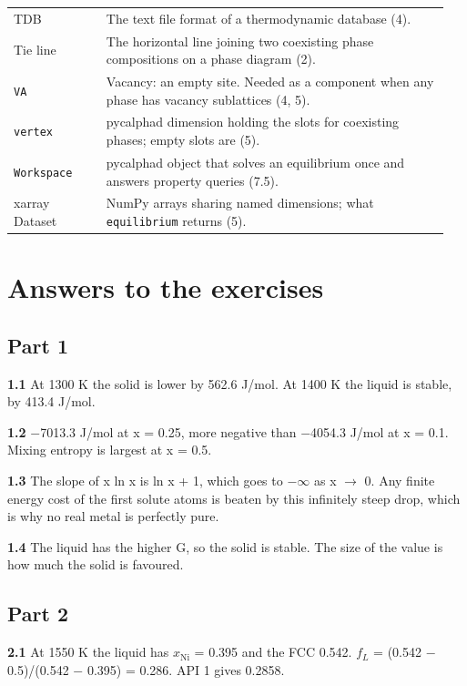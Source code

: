 \documentclass[12pt,a4paper]{article}
\begin{document}
\begin{longtable}{>{\raggedright\arraybackslash}p{0.202\linewidth}>{\raggedright\arraybackslash}p{0.745\linewidth}}
TDB & The text file format of a thermodynamic database (4). \\
Tie line & The horizontal line joining two coexisting phase compositions on a phase diagram (2). \\
\texttt{VA} & Vacancy: an empty site. Needed as a component when any phase has vacancy sublattices (4, 5). \\
\texttt{vertex} & pycalphad dimension holding the slots for coexisting phases; empty slots are \texttt{\textquotesingle{}\textquotesingle{}} (5). \\
\texttt{Workspace} & pycalphad object that solves an equilibrium once and answers property queries (7.5). \\
xarray Dataset & NumPy arrays sharing named dimensions; what \texttt{equilibrium} returns (5). \\
\bottomrule
\end{longtable}
\endgroup

\section*{Answers to the exercises}

\subsection*{Part 1}
\textbf{1.1} At 1300 K the solid is lower by 562.6 J/mol. At 1400 K the liquid is stable, by 413.4 J/mol.

\textbf{1.2} \(-\)7013.3 J/mol at x = 0.25, more negative than \(-\)4054.3 J/mol at x = 0.1. Mixing entropy is largest at x = 0.5.

\textbf{1.3} The slope of x ln x is ln x + 1, which goes to \(- \infty\) as x \(\rightarrow\) 0. Any finite energy cost of the first solute atoms is beaten by this infinitely steep drop, which is why no real metal is perfectly pure.

\textbf{1.4} The liquid has the higher G, so the solid is stable. The size of the value is how much the solid is favoured.


\subsection*{Part 2}
\textbf{2.1} At 1550 K the liquid has \(x_{\mathrm{Ni}}\) = 0.395 and the FCC 0.542. \(f_{L}\) = (0.542 \(-\) 0.5)/(0.542 \(-\) 0.395) = 0.286. API 1 gives 0.2858.
\end{document}
